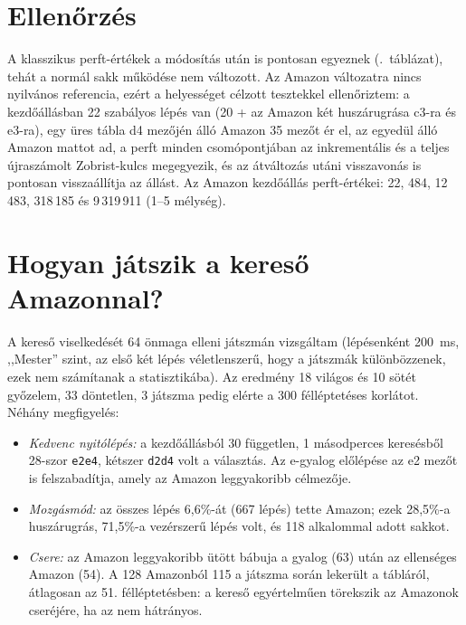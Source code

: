 \section{Ellenőrzés}

A klasszikus perft-értékek a módosítás után is pontosan egyeznek (.~táblázat), tehát a normál sakk működése nem változott. Az Amazon változatra nincs nyilvános referencia, ezért a helyességet célzott tesztekkel ellenőriztem: a kezdőállásban 22 szabályos lépés van (20 + az Amazon két huszárugrása c3-ra és e3-ra), egy üres tábla d4 mezőjén álló Amazon 35 mezőt ér el, az egyedül álló Amazon mattot ad, a perft minden csomópontjában az inkrementális és a teljes újraszámolt Zobrist-kulcs megegyezik, és az átváltozás utáni visszavonás is pontosan visszaállítja az állást. Az Amazon kezdőállás perft-értékei: 22, 484, 12\,483, 318\,185 és 9\,319\,911 (1--5 mélység).

\section{Hogyan játszik a kereső Amazonnal?}

A kereső viselkedését 64 önmaga elleni játszmán vizsgáltam (lépésenként 200~ms, ,,Mester'' szint, az első két lépés véletlenszerű, hogy a játszmák különbözzenek, ezek nem számítanak a statisztikába). Az eredmény 18 világos és 10 sötét győzelem, 33 döntetlen, 3 játszma pedig elérte a 300 félléptetéses korlátot. Néhány megfigyelés:
\begin{itemize}
	\item \emph{Kedvenc nyitólépés:} a kezdőállásból 30 független, 1 másodperces keresésből 28-szor \texttt{e2e4}, kétszer \texttt{d2d4} volt a választás. Az e-gyalog előlépése az e2 mezőt is felszabadítja, amely az Amazon leggyakoribb célmezője.
	\item \emph{Mozgásmód:} az összes lépés 6,6\%-át (667 lépés) tette Amazon; ezek 28,5\%-a huszárugrás, 71,5\%-a vezérszerű lépés volt, és 118 alkalommal adott sakkot.
	\item \emph{Csere:} az Amazon leggyakoribb ütött bábuja a gyalog (63) után az ellenséges Amazon (54). A 128 Amazonból 115 a játszma során lekerült a tábláról, átlagosan az 51. félléptetésben: a kereső egyértelműen törekszik az Amazonok cseréjére, ha az nem hátrányos.
\end{itemize}

